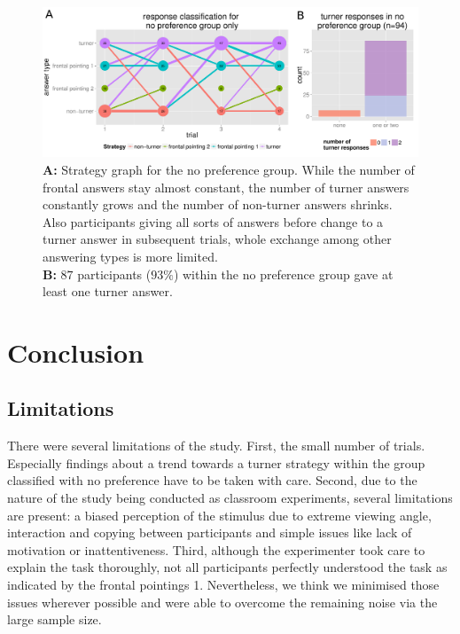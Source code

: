 \documentclass{frontiersSCNS} %
\begin{document}
\begin{figure}[h!]
  \centering
    \includegraphics[width=\textwidth]{figures/stratGraphNP.pdf}
   \caption{ \footnotesize \textbf{A:} Strategy graph for the no preference group. While the number of frontal answers stay almost constant, the number of turner answers constantly grows and the number of non-turner answers shrinks. Also participants giving all sorts of answers before change to a turner answer in subsequent trials, whole exchange among other answering types is more limited.\\
\textbf{B:} $87$ participants ($93\%$) within the no preference group gave at least one turner answer.}
   \label{fig:npDevelopment}
\end{figure}



\section{Conclusion}

\subsection{Limitations}
There were several limitations of the study. First, the small number of trials. Especially findings about a trend towards a turner strategy within the group classified with no preference have to be taken with care. Second, due to the nature of the study being conducted as classroom experiments, several limitations are present: a biased perception of the stimulus due to extreme viewing angle, interaction and copying between participants and simple issues like lack of motivation or inattentiveness. Third, although the experimenter took care to explain the task thoroughly, not all participants perfectly understood the task as indicated by the frontal pointings 1. Nevertheless, we think we minimised those issues wherever possible and were able to overcome the remaining noise via the large sample size.
\end{document}
